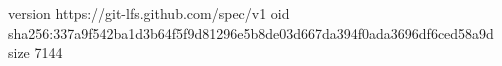 version https://git-lfs.github.com/spec/v1
oid sha256:337a9f542ba1d3b64f5f9d81296e5b8de03d667da394f0ada3696df6ced58a9d
size 7144
